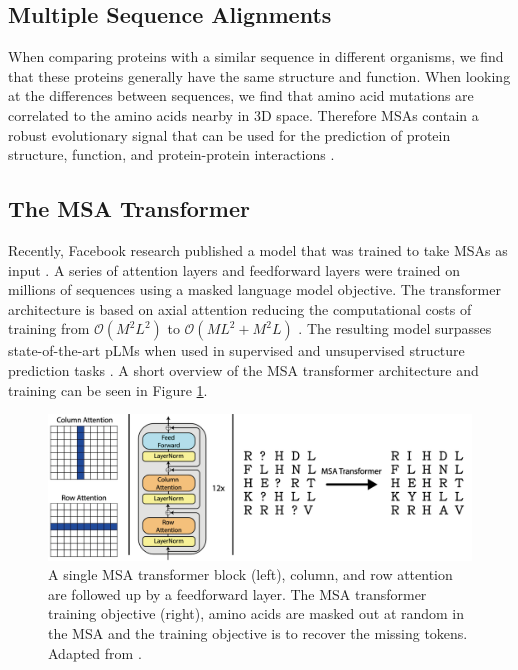 \documentclass[11pt,a4paper]{article}
\begin{document}
\subsection{Multiple Sequence Alignments}
When comparing proteins with a similar sequence in different organisms, we find that these proteins generally have the same structure and function. When looking at the differences between sequences, we find that amino acid mutations are correlated to the amino acids nearby in 3D space. Therefore MSAs contain a robust evolutionary signal that can be used for the prediction of protein structure, function, and protein-protein interactions \cite{yanofsky1964protein, gobel1994correlated}.

\subsection{The MSA Transformer}
Recently, Facebook research published a model that was trained to take MSAs as input \cite{rao2021msa}. A series of attention layers and feedforward layers were trained on millions of sequences using a masked language model objective. The transformer architecture is based on axial attention reducing the computational costs of training from $\mathcal{O}(M^2L^2)$ to $\mathcal{O}(ML^2 + M^2L)$ \cite{ho2019axial}. The resulting model surpasses state-of-the-art pLMs when used in supervised and unsupervised structure prediction tasks \cite{rao2021msa}. 
A short overview of the MSA transformer architecture and training can be seen in Figure \ref{fig1}.

\begin{figure}[h]
\centering
\includegraphics[width=\textwidth]{MSA_transformer.png}
\caption{A single MSA transformer block (left), column, and row attention are followed up by a feedforward layer. The MSA transformer training objective (right), amino acids are masked out at random in the MSA and the training objective is to recover the missing tokens. Adapted from \cite{rao2020transformer}.}
\label{fig1}
\end{figure}
\end{document}
